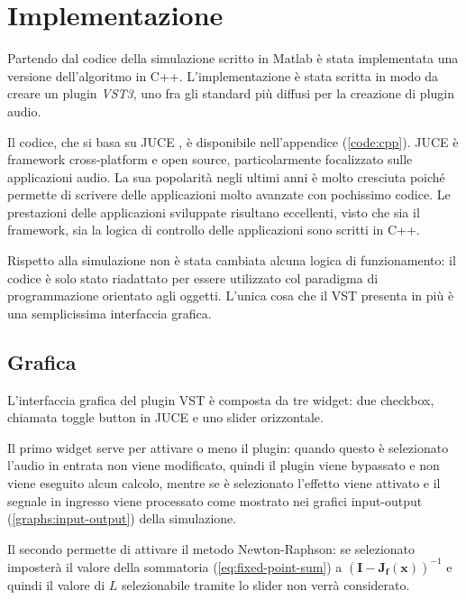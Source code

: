 \chapter{Implementazione}
	\label{sec:implementazione}
	Partendo dal codice della simulazione scritto in Matlab è stata implementata una versione dell'algoritmo in C++. L'implementazione è stata scritta in modo da creare un plugin \textit{VST3}, uno fra gli standard più diffusi per la creazione di plugin audio.
	
	Il codice, che si basa su JUCE \cite{juce}, è disponibile nell'appendice (\ref{code:cpp}). JUCE è framework cross-platform e open source, particolarmente focalizzato sulle applicazioni audio. La sua popolarità negli ultimi anni è molto cresciuta poiché permette di scrivere delle applicazioni molto avanzate con pochissimo codice. Le prestazioni delle applicazioni sviluppate risultano eccellenti, visto che sia il framework, sia la logica di controllo delle applicazioni sono scritti in C++.
	
	Rispetto alla simulazione non è stata cambiata alcuna logica di funzionamento: il codice è solo stato riadattato per essere utilizzato col paradigma di programmazione orientato agli oggetti. L'unica cosa che il VST presenta in più è una semplicissima interfaccia grafica.
	\pagebreak
	
	\section{Grafica}
		L'interfaccia grafica del plugin VST è composta da tre widget: due checkbox, chiamata toggle button in JUCE e uno slider orizzontale.
		
		
		Il primo widget serve per attivare o meno il plugin: quando questo è selezionato l'audio in entrata non viene modificato, quindi il plugin viene bypassato e non viene eseguito alcun calcolo, mentre se è selezionato l'effetto viene attivato e il segnale in ingresso viene processato come mostrato nei grafici input-output (\ref{graphs:input-output}) della simulazione.
		
		Il secondo permette di attivare il metodo Newton-Raphson: se selezionato imposterà il valore della sommatoria (\ref{eq:fixed-point-sum}) a $(\mathbf{I}-\mathbf{J_{f}(x)})^{-1}$ e quindi il valore di $L$ selezionabile tramite lo slider non verrà considerato.
		
		
